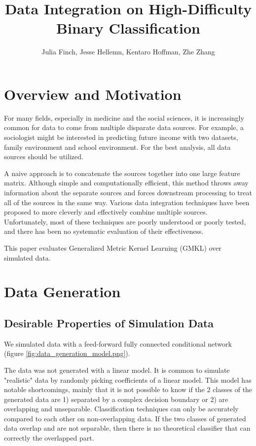 \documentclass{article}
\begin{document}
\title{Data Integration on High-Difficulty Binary Classification}
\author{Julia Finch, Jesse Hellemn, Kentaro Hoffman, Zhe Zhang}
\maketitle


\section{Overview and Motivation}
For many fields, especially in medicine and the social sciences, it is
increasingly common for data to come from multiple disparate data sources. For
example, a sociologist might be interested in predicting future income with two
datasets, family environment and school environment. For the best analysis, all
data sources should be utilized.


A naive approach is to concatenate the sources together into one large feature
matrix. Although simple and computationally efficient, this method throws away
information about the separate sources and forces downstream processing to
treat all of the sources in the same way. Various data integration techniques
have been proposed to more cleverly and effectively combine multiple sources.
Unfortunately, most of these techniques are poorly understood or poorly tested,
and there has been no systematic evaluation of their effectiveness.


This paper evaluates Generalized Metric Kernel Learning (GMKL) over simulated
data.


\section{Data Generation}

\subsection{Desirable Properties of Simulation Data}
We simulated data with a feed-forward fully connected conditional network
(figure \ref{fig:data_generation_model.png}).

The data was not generated with a linear model. It is common to simulate
"realistic" data by randomly picking coefficients of a linear model. This model
has notable shortcomings, mainly that it is not possible to know if the 2
classes of the generated data are 1) separated by a complex decision boundary
or 2) are overlapping and unseparable. Classification techniques can only be
accurately compared to each other on non-overlapping data. If the two classes
of generated data overlap and are not separable, then there is no theoretical
classifier that can correctly the overlapped part.
\end{document}
